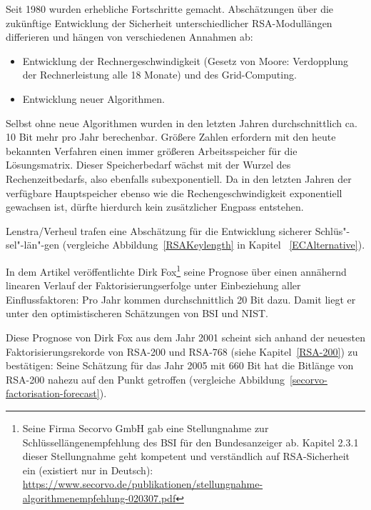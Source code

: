 \begin{refsegment}
Seit 1980 wurden erhebliche Fortschritte gemacht.
Abschätzungen über die zukünftige Entwicklung der Sicherheit
unterschiedlicher RSA-Modullängen differieren und hängen von
verschiedenen Annahmen ab:
\begin{itemize}
   \item Entwicklung der Rechnergeschwindigkeit (Gesetz von Moore:
         Verdopplung der Rechnerleistung alle 18 Monate)
         und des Grid-Computing.
   \item Entwicklung neuer Algorithmen.
\end{itemize}
Selbst ohne neue Algorithmen wurden in den letzten Jahren durchschnittlich
ca. 10 Bit mehr pro Jahr berechenbar.  Größere Zahlen erfordern mit den
heute bekannten Verfahren einen immer größeren Arbeitsspeicher für die
Lösungsmatrix. Dieser Speicherbedarf wächst mit der Wurzel des
Rechenzeitbedarfs, also ebenfalls subexponentiell. Da in den letzten Jahren
der verfügbare Hauptspeicher ebenso wie die Rechengeschwindigkeit exponentiell
gewachsen ist, dürfte hierdurch kein zusätzlicher Engpass entstehen.


Lenstra/Verheul \cite{LeVe2001} trafen eine Abschätzung für die Entwicklung sicherer Schlüs"-sel"-län"-gen (vergleiche Abbildung~\ref{RSAKeylength}
in Kapitel ~\ref{ECAlternative}).


\begin{sloppypar}  %
  In dem Artikel \cite{Bourseau2002} veröffentlichte Dirk Fox\footnote{%
  Seine Firma Secorvo GmbH gab eine Stellungnahme zur
  Schlüssellängenempfehlung des BSI für den Bundesanzeiger
  ab. Kapitel 2.3.1 dieser Stellungnahme geht kompetent
  und verständlich auf RSA-Sicherheit ein (existiert nur in Deutsch):\\
  \url{https://www.secorvo.de/publikationen/stellungnahme-algorithmenempfehlung-020307.pdf}
  }
  seine Prognose über einen annähernd linearen Verlauf der Faktorisierungserfolge
  unter Einbeziehung aller Einflussfaktoren: Pro Jahr kommen durchschnittlich 20
  Bit dazu. Damit liegt er unter den optimistischeren Schätzungen von BSI und NIST.
\end{sloppypar}
\noindent

Diese Prognose von Dirk Fox aus dem Jahr 2001 scheint sich
anhand der neuesten Faktorisierungsrekorde von RSA-200 und RSA-768 (siehe Kapitel~\ref{RSA-200})
zu bestätigen: Seine Schätzung für das Jahr 2005 mit 660 Bit hat die Bitlänge
von RSA-200 nahezu auf den Punkt getroffen (vergleiche
Abbildung~\ref{secorvo-factorisation-forecast}).


\end{refsegment}
